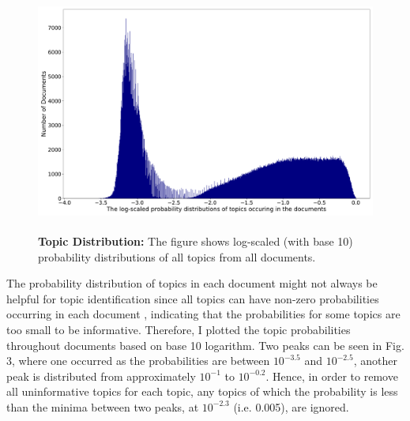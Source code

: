 \begin{figure}[H]
    \centering
    \includegraphics[width = 14cm, height = 8cm]{Code/img/distri_doc_word_counts.pdf}
    \caption[Probability distributions of all topics from all documents]{\textbf{Topic Distribution:} The figure shows log-scaled (with base 10) probability distributions of all topics from all documents.}
\end{figure}

The probability distribution of topics in each document might not always be helpful for topic identification since all topics can have non-zero probabilities occurring in each document \cite{LDA}, indicating that the probabilities for some topics are too small to be informative. Therefore, I plotted the topic probabilities throughout documents based on base 10 logarithm. Two peaks can be seen in Fig. 3, where one occurred as the probabilities are between $10^{-3.5}$ and $10^{-2.5}$, another peak is distributed from approximately $10^{-1}$ to $10^{-0.2}$. Hence, in order to remove all uninformative topics for each topic, any topics of which the probability is less than the minima between two peaks, at $10^{-2.3}$ (i.e. 0.005), are ignored.

